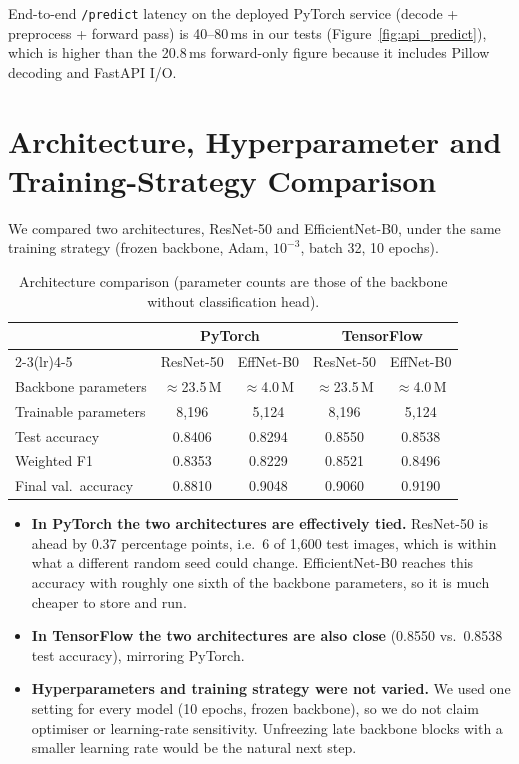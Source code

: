 \documentclass[11pt,a4paper]{article}
\begin{document}
\noindent End-to-end \texttt{/predict} latency on the deployed PyTorch service (decode + preprocess + forward pass) is 40--80\,ms in our tests (Figure~\ref{fig:api_predict}), which is higher than the 20.8\,ms forward-only figure because it includes Pillow decoding and FastAPI I/O.

\section{Architecture, Hyperparameter and Training-Strategy Comparison}
\label{sec:archcomp}
We compared two architectures, ResNet-50 and EfficientNet-B0, under the same training strategy (frozen backbone, Adam, $10^{-3}$, batch 32, 10 epochs).

\begin{table}[H]
\centering
\caption{Architecture comparison (parameter counts are those of the backbone without classification head).}
\label{tab:archcomp}
\begin{tabular}{lcccc}
\toprule
 & \multicolumn{2}{c}{PyTorch} & \multicolumn{2}{c}{TensorFlow} \\
\cmidrule(lr){2-3}\cmidrule(lr){4-5}
 & ResNet-50 & EffNet-B0 & ResNet-50 & EffNet-B0 \\
\midrule
Backbone parameters & $\approx$23.5\,M & $\approx$4.0\,M & $\approx$23.5\,M & $\approx$4.0\,M \\
Trainable parameters & 8{,}196 & 5{,}124 & 8{,}196 & 5{,}124 \\
Test accuracy & 0.8406 & 0.8294 & 0.8550 & 0.8538 \\
Weighted F1 & 0.8353 & 0.8229 & 0.8521 & 0.8496 \\
Final val.\ accuracy & 0.8810 & 0.9048 & 0.9060 & 0.9190 \\
\bottomrule
\end{tabular}
\end{table}

\begin{itemize}
  \item \textbf{In PyTorch the two architectures are effectively tied.} ResNet-50 is ahead by 0.37 percentage points, i.e.\ 6 of 1{,}600 test images, which is within what a different random seed could change. EfficientNet-B0 reaches this accuracy with roughly one sixth of the backbone parameters, so it is much cheaper to store and run.
  \item \textbf{In TensorFlow the two architectures are also close} (0.8550 vs.\ 0.8538 test accuracy), mirroring PyTorch.
  \item \textbf{Hyperparameters and training strategy were not varied.} We used one setting for every model (10 epochs, frozen backbone), so we do not claim optimiser or learning-rate sensitivity. Unfreezing late backbone blocks with a smaller learning rate would be the natural next step.
\end{itemize}
\end{document}
